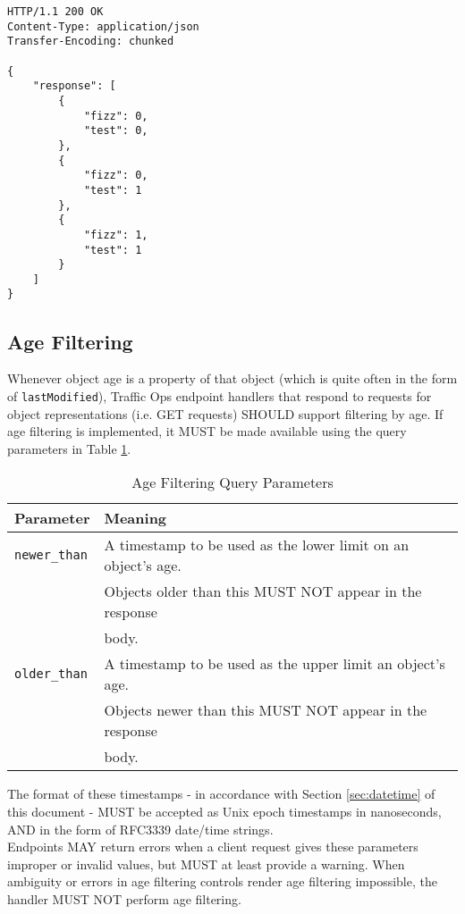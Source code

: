 \documentclass{article}
\newenvironment{codelisting}{\captionsetup{type=listing}}{}
\newcommand{\code}[1]{\texttt{\color{inlinecodecolor}#1}}
\begin{document}
\newpage{}

\begin{codelisting}
\label{code:sorted-foos}
\begin{verbatim}
HTTP/1.1 200 OK
Content-Type: application/json
Transfer-Encoding: chunked

{
	"response": [
		{
			"fizz": 0,
			"test": 0,
		},
		{
			"fizz": 0,
			"test": 1
		},
		{
			"fizz": 1,
			"test": 1
		}
	]
}
\end{verbatim}
\end{codelisting}

\subsection{Age Filtering}
Whenever object age is a property of that object (which is quite often in the form of \code{lastModified}), Traffic Ops endpoint
handlers that respond to requests for object representations (i.e. GET requests) SHOULD support filtering by age. If age filtering
is implemented, it MUST be made available using the query parameters in Table \ref{tbl:age-filtering-qparams}.

\begin{table}[h]
\centering
\caption{Age Filtering Query Parameters}
\label{tbl:age-filtering-qparams}
\begin{tabular}{|l|l|}
\hline
\textbf{Parameter} & \textbf{Meaning}\\
\hline
\code{newer\_than} & A timestamp to be used as the lower limit on an object's age.\\
                   & Objects older than this MUST NOT appear in the response\\
                   & body.\\
\hline
\code{older\_than} & A timestamp to be used as the upper limit an object's age.\\
                   & Objects newer than this MUST NOT appear in the response\\
                   & body.\\
\hline
\end{tabular}
\end{table}

The format of these timestamps - in accordance with Section \ref{sec:datetime} of this document - MUST be accepted as Unix epoch timestamps
in nanoseconds, AND in the form of RFC3339 date/time strings.\\
Endpoints MAY return errors when a client request gives these parameters improper or invalid values, but MUST at least provide a warning.
When ambiguity or errors in age filtering controls render age filtering impossible, the handler MUST NOT perform age filtering.
\end{document}
